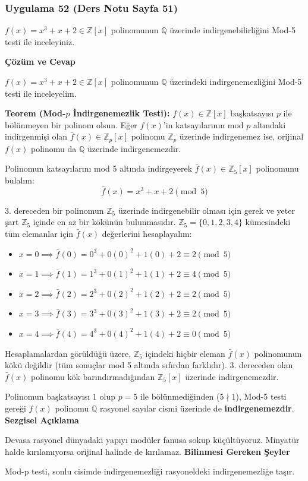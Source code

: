\documentclass[11pt, a4paper]{article}
\newenvironment{cozum}{
    \vspace{0.5cm}
    \noindent\textcolor{green!60!black}{\faCheckCircle\enspace \textbf{\Large Çözüm ve Cevap}}\par\vspace{0.2cm}
}{}
\newenvironment{sezgisel}{
    \vspace{0.5cm}
    \noindent\textcolor{orange!80!black}{\faLightbulb\enspace \textbf{\Large Sezgisel Açıklama}}\par\vspace{0.2cm}
    \itshape
}{}
\newenvironment{bilgi}{
    \vspace{0.5cm}
    \noindent\textcolor{red!70!black}{\faExclamationTriangle\enspace \textbf{\Large Bilinmesi Gereken Şeyler}}\par\vspace{0.2cm}
}{}
\begin{document}
\newpage
\subsubsection{Uygulama 52 (Ders Notu Sayfa 51)}
\begin{sorubox}
$f(x)=x^3+x+2 \in \mathbb{Z}[x]$ polinomunun $\mathbb{Q}$ üzerinde indirgenebilirliğini Mod-5 testi ile inceleyiniz.
\end{sorubox}
\begin{cozum}
$f(x) = x^{3} + x + 2 \in \mathbb{Z}[x]$ polinomunun $\mathbb{Q}$ üzerindeki indirgenemezliğini Mod-5 testi ile inceleyelim.

\textbf{Teorem (Mod-$p$ İndirgenemezlik Testi):} $f(x) \in \mathbb{Z}[x]$ başkatsayısı $p$ ile bölünmeyen bir polinom olsun. Eğer $f(x)$'in katsayılarının mod $p$ altındaki indirgenmişi olan $\bar{f}(x) \in \mathbb{Z}_p[x]$ polinomu $\mathbb{Z}_p$ üzerinde indirgenemez ise, orijinal $f(x)$ polinomu da $\mathbb{Q}$ üzerinde indirgenemezdir.

Polinomun katsayılarını mod 5 altında indirgeyerek $\bar{f}(x) \in \mathbb{Z}_{5}[x]$ polinomunu bulalım:
\[ \bar{f}(x) = x^{3} + x + 2 \pmod{5} \]

3. dereceden bir polinomun $\mathbb{Z}_{5}$ üzerinde indirgenebilir olması için gerek ve yeter şart $\mathbb{Z}_{5}$ içinde en az bir kökünün bulunmasıdır. $\mathbb{Z}_{5} = \{0, 1, 2, 3, 4\}$ kümesindeki tüm elemanlar için $\bar{f}(x)$ değerlerini hesaplayalım:
\begin{itemize}
    \item $x = 0 \implies \bar{f}(0) = 0^3 + 0(0)^2 + 1(0) + 2 \equiv 2 \pmod{5}$
    \item $x = 1 \implies \bar{f}(1) = 1^3 + 0(1)^2 + 1(1) + 2 \equiv 4 \pmod{5}$
    \item $x = 2 \implies \bar{f}(2) = 2^3 + 0(2)^2 + 1(2) + 2 \equiv 2 \pmod{5}$
    \item $x = 3 \implies \bar{f}(3) = 3^3 + 0(3)^2 + 1(3) + 2 \equiv 2 \pmod{5}$
    \item $x = 4 \implies \bar{f}(4) = 4^3 + 0(4)^2 + 1(4) + 2 \equiv 0 \pmod{5}$
\end{itemize}

Hesaplamalardan görüldüğü üzere, $\mathbb{Z}_{5}$ içindeki hiçbir eleman $\bar{f}(x)$ polinomunun kökü değildir (tüm sonuçlar mod 5 altında sıfırdan farklıdır). 3. dereceden olan $\bar{f}(x)$ polinomu kök barındırmadığından $\mathbb{Z}_{5}[x]$ üzerinde indirgenemezdir.

Polinomun başkatsayısı $1$ olup $p = 5$ ile bölünmediğinden ($5 \nmid 1$), Mod-5 testi gereği $f(x)$ polinomu $\mathbb{Q}$ rasyonel sayılar cismi üzerinde de \textbf{indirgenemezdir}.
\end{cozum}
\begin{sezgisel}
Devasa rasyonel dünyadaki yapıyı modüler fanusa sokup küçültüyoruz. Minyatür halde kırılamıyorsa orijinal halinde de kırılamaz.
\end{sezgisel}
\begin{bilgi}
Mod-p testi, sonlu cisimde indirgenemezliği rasyoneldeki indirgenemezliğe taşır.
\end{bilgi}
\end{document}
